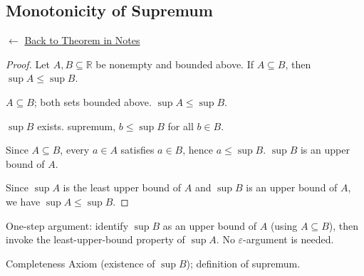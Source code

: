 
\subsection*{Monotonicity of Supremum}
\label{prf:monotonicity-of-supremum}

\begin{remark*}[Return]
$\leftarrow$ \hyperref[thm:monotonicity]{Back to Theorem in Notes}
\end{remark*}

\begin{proof}
\Claim Let $A, B \subseteq \mathbb{R}$ be nonempty and bounded above.
If $A \subseteq B$, then $\sup A \le \sup B$.

\Given $A \subseteq B$; both sets bounded above.
\Goal $\sup A \le \sup B$.

 $\sup B$ exists.
\ByDef supremum, $b \le \sup B$ for all $b \in B$.

Since $A \subseteq B$, every $a \in A$ satisfies $a \in B$, hence $a \le \sup B$.
\Therefore $\sup B$ is an upper bound of $A$.

Since $\sup A$ is the least upper bound of $A$ and $\sup B$ is an upper bound
of $A$, we have $\sup A \le \sup B$. \AsReq
\end{proof}

\begin{remark*}
One-step argument: identify $\sup B$ as an upper bound of $A$ (using
$A \subseteq B$), then invoke the least-upper-bound property of $\sup A$.
No $\varepsilon$-argument is needed.
\end{remark*}

\begin{remark*}[Dependencies]
Completeness Axiom (existence of $\sup B$); definition of supremum.
\end{remark*}
